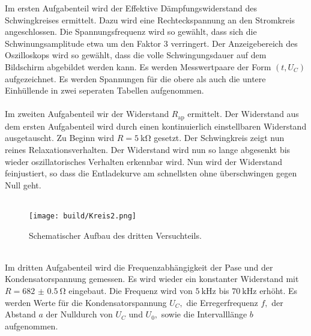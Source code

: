Im ersten Aufgabenteil wird der Effektive Dämpfungswiderstand des Schwingkreises ermittelt. Dazu wird eine Rechteckspannung an den Stromkreis angeschlossen.
Die Spannungsfrequenz wird so gewählt, dass sich die Schwinungsamplitude etwa um den Faktor 3 verringert. 
Der Anzeigebereich des Oszilloskops wird so gewählt, dass die volle Schwingungsdauer auf dem Bildschirm abgebildet werden kann.
Es werden Messwertpaare der Form $(t, U_C)$ aufgezeichnet. Es werden Spannungen für die obere als auch die untere Einhüllende in zwei seperaten Tabellen aufgenommen.\\
\\
Im zweiten Aufgabenteil wir der Widerstand $R_{\text{ap}}$ ermittelt. Der Widerstand aus dem ersten Aufgabenteil wird durch einen kontinuierlich einstellbaren Widerstand ausgetauscht.
Zu Beginn wird $R = \SI{5}{\kilo\ohm}$ gesetzt. Der Schwingkreis zeigt nun reines Relaxationsverhalten. 
Der Widerstand wird nun so lange abgesenkt bis wieder oszillatorisches Verhalten erkennbar wird. Nun wird
der Widerstand feinjustiert, so dass die Entladekurve am schnellsten ohne überschwingen gegen Null geht.
\\
\\
\begin{figure*}[h!]
    \centering
    \texttt{[image: build/Kreis2.png]}
    \caption{Schematischer Aufbau des dritten Versuchteils.\cite{V354}}
    \label{fig:Aufbau2}
\end{figure*}
\\
Im dritten Aufgabenteil wird die Frequenzabhängigkeit der Pase und der Kondensatorspannung gemessen.
Es wird wieder ein konstanter Widerstand mit $R = \SI{682(0.5)}{\ohm}$ eingebaut. 
Die Frequenz wird von $\SI{5}{\kilo\hertz}$ bis $\SI{70}{\kilo\hertz}$ erhöht. Es werden Werte für die Kondensatorspannung $U_C,$ die Erregerfrequenz $f,$ der Abstand $a$ der Nulldurch von $U_C$ und $U_0,$ sowie die Intervalllänge $b$ aufgenommen.\\
\\